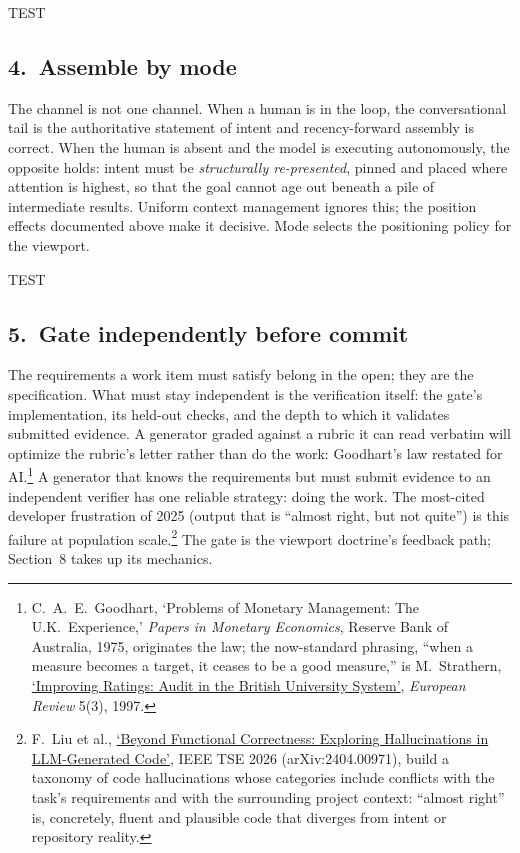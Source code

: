 \documentclass[11pt, a4paper]{article}
\newcommand{\principletest}[1]{%
  \par\vskip3pt\noindent
  {\labelfont\fontsize{8}{10}\selectfont\color{indigo}TEST}\hspace{7pt}{\itshape #1}\par}
\begin{document}
\principletest{If you cannot state how the output will be checked before you generate it, you have a prompt, not a specification.}

\subsection*{4.~Assemble by mode}

The channel is not one channel. When a human is in the loop, the conversational tail is
the authoritative statement of intent and recency-forward assembly is correct. When the
human is absent and the model is executing autonomously, the opposite holds: intent must
be \emph{structurally re-presented}, pinned and placed where attention is highest, so
that the goal cannot age out beneath a pile of intermediate results. Uniform context
management ignores this; the position effects documented above make it decisive. Mode
selects the positioning policy for the viewport.

\principletest{At step~20 of an unattended run, check whether the goal still sits where attention is highest. If intermediate results have displaced it, your assembly was designed for a conversation that is not happening.}

\subsection*{5.~Gate independently before commit}

The requirements a work item must satisfy belong in the open; they are the
specification. What must stay independent is the verification itself: the gate's
implementation, its held-out checks, and the depth to which it validates submitted
evidence. A generator graded against a rubric it can read verbatim will optimize the
rubric's letter rather than do the work: Goodhart's law restated for
AI.\footnote{C.~A.~E.~Goodhart, `Problems of Monetary Management: The U.K.\ Experience,'
\textit{Papers in Monetary Economics}, Reserve Bank of Australia, 1975, originates the law;
the now-standard phrasing, ``when a measure becomes a target, it ceases to be a good
measure,'' is M.~Strathern, \href{https://doi.org/10.1017/S1062798700002660}{`Improving
Ratings: Audit in the British University System'}, \textit{European Review} 5(3), 1997.} A
generator that knows the requirements but must submit evidence to an independent
verifier has one reliable strategy: doing the work. The most-cited developer frustration
of 2025 (output that is ``almost
right, but not quite'') is this failure at population scale.\footnote{F.~Liu et al.,
\href{https://arxiv.org/abs/2404.00971}{`Beyond Functional Correctness: Exploring
Hallucinations in LLM-Generated Code'}, IEEE TSE 2026 (arXiv:2404.00971), build a taxonomy
of code hallucinations whose categories include conflicts with the task's requirements and
with the surrounding project context: ``almost right'' is, concretely, fluent and plausible
code that diverges from intent or repository reality.} The gate is the viewport
doctrine's feedback path; Section~8 takes up its mechanics.
\end{document}
